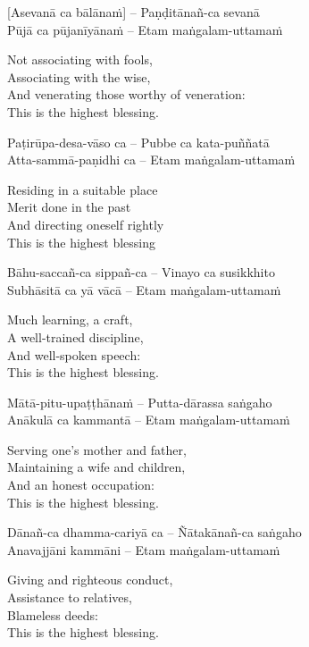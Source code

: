 [Asevanā ca bālānaṁ] – Paṇḍitānañ-ca sevanā\\
Pūjā ca pūjanīyānaṁ – Etam maṅgalam-uttamaṁ

\begin{english}
  Not associating with fools,\\
  Associating with the wise,\\
  And venerating those worthy of veneration:\\
  This is the highest blessing.
\end{english}

Paṭirūpa-desa-vāso ca – Pubbe ca kata-puññatā\\
Atta-sammā-paṇidhi ca – Etam maṅgalam-uttamaṁ

\begin{english}
  Residing in a suitable place\\
  Merit done in the past\\
  And directing oneself rightly\\
  This is the highest blessing
\end{english}

Bāhu-saccañ-ca sippañ-ca – Vinayo ca susikkhito\\
Subhāsitā ca yā vācā – Etam maṅgalam-uttamaṁ

\begin{english}
  Much learning, a craft,\\
  A well-trained discipline,\\
  And well-spoken speech:\\
  This is the highest blessing.
\end{english}

Mātā-pitu-upaṭṭhānaṁ – Putta-dārassa saṅgaho\\
Anākulā ca kammantā – Etam maṅgalam-uttamaṁ

\begin{english}
  Serving one’s mother and father,\\
  Maintaining a wife and children,\\
  And an honest occupation:\\
  This is the highest blessing.
\end{english}

Dānañ-ca dhamma-cariyā ca – Ñātakānañ-ca saṅgaho\\
Anavajjāni kammāni – Etam maṅgalam-uttamaṁ

\begin{english}
  Giving and righteous conduct,\\
  Assistance to relatives,\\
  Blameless deeds:\\
  This is the highest blessing.
\end{english}

